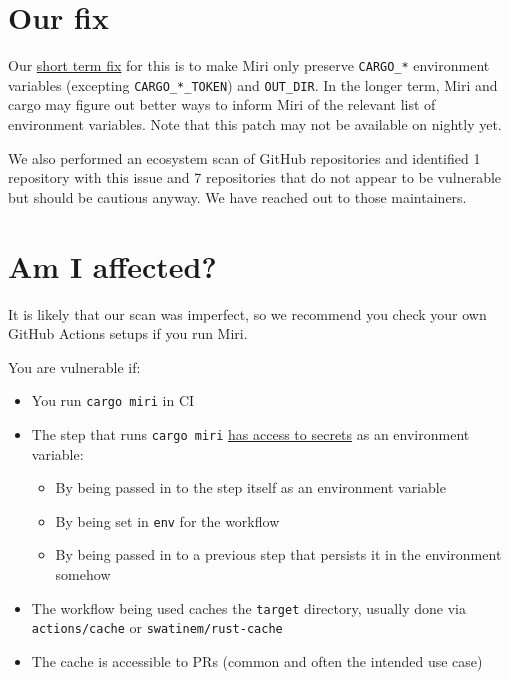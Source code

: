 \documentclass[11pt,a4paper]{article}
\begin{document}
\section{Our fix}

Our \href{https://github.com/rust-lang/miri/pull/5337}{short term fix} for this is to make Miri only preserve \texttt{CARGO_*} environment variables (excepting \texttt{CARGO_*_TOKEN}) and \texttt{OUT_DIR}. In the longer term, Miri and cargo may figure out better ways to inform Miri of the relevant list of environment variables. Note that this patch may not be available on nightly yet.

We also performed an ecosystem scan of GitHub repositories and identified 1 repository with this issue and 7 repositories that do not appear to be vulnerable but should be cautious anyway. We have reached out to those maintainers.

\section{Am I affected?}

It is likely that our scan was imperfect, so we recommend you check your own GitHub Actions setups if you run Miri.

You are vulnerable if:

\begin{itemize}
\item You run \texttt{cargo miri} in CI
\item The step that runs \texttt{cargo miri} \href{https://docs.github.com/en/actions/how-tos/write-workflows/choose-what-workflows-do/use-secrets\#using-secrets-in-a-workflow}{has access to secrets} as an environment variable:
  \begin{itemize}
\item By being passed in to the step itself as an environment variable
\item By being set in \texttt{env} for the workflow
\item By being passed in to a previous step that persists it in the environment somehow
  \end{itemize}
\item The workflow being used caches the \texttt{target} directory, usually done via \texttt{actions/cache} or \texttt{swatinem/rust-cache}
\item The cache is accessible to PRs (common and often the intended use case)
\end{itemize}
\end{document}
